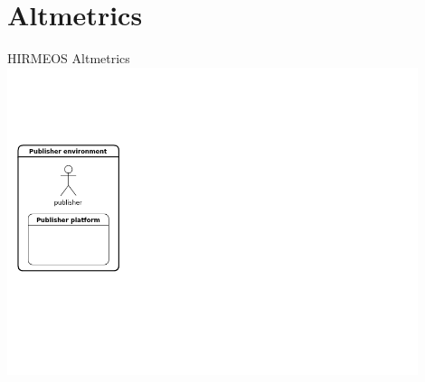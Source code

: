 \documentclass[xcolor=svgnames]{beamer}
\begin{document}
\section{Altmetrics}


        \begin{frame}{HIRMEOS Altmetrics}
            \includegraphics[width=0.9\textwidth]{img/h1}
        \end{frame}
\end{document}
